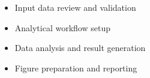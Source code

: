 \begin{itemize}[leftmargin=1.5em]
    \item Input data review and validation
    \item Analytical workflow setup
    \item Data analysis and result generation
    \item Figure preparation and reporting
\end{itemize}